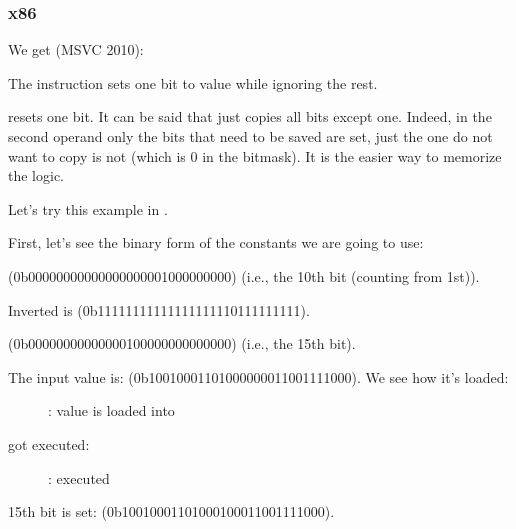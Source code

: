\subsubsection{x86}


We get (MSVC 2010):




The \OR instruction sets one bit to value while ignoring the rest.


\AND resets one bit. It can be said that \AND just copies all bits except one.
Indeed, in the second \AND operand only the bits that need to be saved are set,
just the one do not want to copy is not (which is 0 in the bitmask).
It is the easier way to memorize the logic.

\clearpage
\mysubparagraph{\olly}

Let's try this example in \olly.

First, let's see the binary form of the constants we are going to use:

 (0b0000000000000000000{\color{red}1}000000000) (i.e., the 10th bit (counting from 1st)).

Inverted  is  (0b1111111111111111111{\color{red}0}111111111).

 (0b00000000000000{\color{red}1}00000000000000) (i.e., the 15th bit).

The input value is:  (0b10010001101000000011001111000).
We see how it's loaded:

\begin{figure}[H]
\centering
{}
\caption{\olly: value is loaded into \ECX}
\label{fig:set_reset_olly1}
\end{figure}

\clearpage
\OR got executed:

\begin{figure}[H]
\centering
{}
\caption{\olly: \OR executed}
\label{fig:set_reset_olly2}
\end{figure}

15th bit is set:  
(0b10010001101000{\color{red}1}00011001111000).

